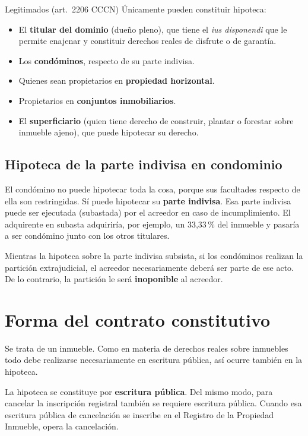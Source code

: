 \documentclass[12pt,oneside]{book}
\begin{document}
\begin{definition}{Legitimados (art.\ 2206 CCCN)}
Únicamente pueden constituir hipoteca:
\begin{itemize}
    \item El \textbf{titular del dominio} (dueño pleno), que tiene el \textit{ius disponendi} que le permite enajenar y constituir derechos reales de disfrute o de garantía.
    \item Los \textbf{condóminos}, respecto de su parte indivisa.
    \item Quienes sean propietarios en \textbf{propiedad horizontal}.
    \item Propietarios en \textbf{conjuntos inmobiliarios}.
    \item El \textbf{superficiario} (quien tiene derecho de construir, plantar o forestar sobre inmueble ajeno), que puede hipotecar su derecho.
\end{itemize}
\end{definition}

\subsection{Hipoteca de la parte indivisa en condominio}

El condómino no puede hipotecar toda la cosa, porque sus facultades respecto de ella son restringidas. Sí puede hipotecar su \textbf{parte indivisa}. Esa parte indivisa puede ser ejecutada (subastada) por el acreedor en caso de incumplimiento. El adquirente en subasta adquiriría, por ejemplo, un 33,33\,\% del inmueble y pasaría a ser condómino junto con los otros titulares.

\begin{important}
Mientras la hipoteca sobre la parte indivisa subsista, si los condóminos realizan la partición extrajudicial, el acreedor necesariamente deberá ser parte de ese acto. De lo contrario, la partición le será \textbf{inoponible} al acreedor.
\end{important}

\section{Forma del contrato constitutivo}

Se trata de un inmueble. Como en materia de derechos reales sobre inmuebles todo debe realizarse necesariamente en escritura pública, así ocurre también en la hipoteca.

\begin{important}
La hipoteca se constituye por \textbf{escritura pública}. Del mismo modo, para cancelar la inscripción registral también se requiere escritura pública. Cuando esa escritura pública de cancelación se inscribe en el Registro de la Propiedad Inmueble, opera la cancelación.
\end{important}
\end{document}

